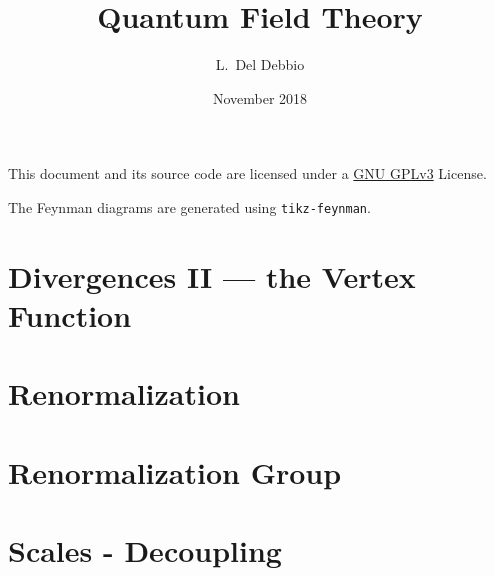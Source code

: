 \documentclass[bibliography=totoc,titlepage=firstiscover]{scrreprt}
\title{Quantum Field Theory}
\author{L.~Del Debbio}
\date{November 2018}
\begin{document}

\tableofcontents

\vspace{\fill}

This document and its source code are licensed under a \href{https://www.gnu.org/licenses/gpl-3.0.en.html}{GNU GPLv3} License.

The Feynman diagrams are generated using \texttt{tikz-feynman}\supercite{ELLIS2017103}.

\nocite{*}
\printbibliography[keyword=recommended,title={Recommended Textbooks},omitnumbers=true]





%







\chapter{Divergences II --- the Vertex Function}
\label{cha:diverg-ii-vert}


\chapter{Renormalization}
\label{cha:renormalization}
% 


\chapter{Renormalization Group}
\label{cha:renorm-group}

\chapter{Scales - Decoupling}
\label{cha:scales-decoupling}

\printindex
\printbibliography[notkeyword=recommended]
\end{document}
